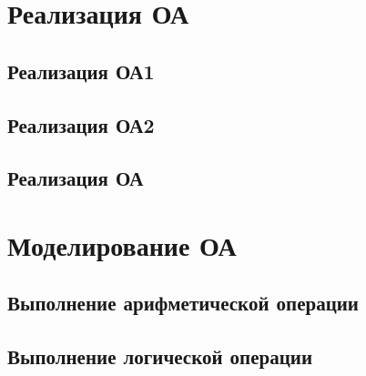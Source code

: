 
\newpage
\section{Реализация ОА}

\subsection{Реализация ОА1}

\subsection{Реализация ОА2}

\subsection{Реализация ОА}

\newpage
\section{Моделирование ОА}

\subsection{Выполнение арифметической операции}

\subsection{Выполнение логической операции}